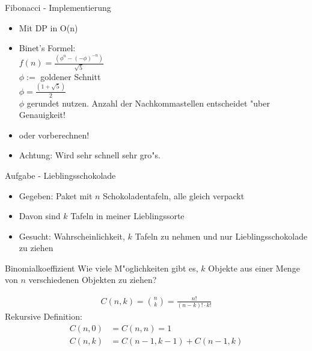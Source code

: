 \documentclass[18pt]{beamer}
\begin{document}
\begin{frame}{Fibonacci - Implementierung}
\begin{itemize}
\item Mit DP in O(n)
\item Binet's Formel: \\
\(f(n) = \frac{(\phi^{n} - (-\phi)^{-n}) }{ \sqrt{5}}\)\\
\(\phi :=\)  goldener Schnitt\\
\(\phi = \frac{ (1+\sqrt{5})}{2}\)\\
\(\phi\) gerundet nutzen. Anzahl der Nachkommastellen entscheidet "uber Genauigkeit!

\item oder vorberechnen!\\
\item Achtung: Wird sehr schnell sehr gro"s.
\end{itemize}
\end{frame}

\begin{frame}{Aufgabe - Lieblingsschokolade}
\begin{itemize}
\item Gegeben: Paket mit $n$ Schokoladentafeln, alle gleich verpackt
\item Davon sind $k$ Tafeln in meiner Lieblingssorte
\item Gesucht: Wahrscheinlichkeit, $k$ Tafeln zu nehmen und nur Lieblingsschokolade zu ziehen
\end{itemize}
\end{frame}

\begin{frame}{Binomialkoeffizient}
Wie viele M"oglichkeiten gibt es, $k$ Objekte aus einer Menge von $n$ verschiedenen Objekten zu ziehen?

\begin{align*}
C\left( n,k \right) = \binom{n}{k} = \frac{n!}{\left( n-k \right) ! \cdot k!}
\end{align*}
Rekursive Definition:
\begin{align*}
C\left( n, 0 \right) &= C\left( n,n \right) = 1 \\
C\left( n,k \right) &= C\left( n-1,k-1 \right) + C\left( n-1,k \right)
\end{align*} %
\end{frame}
\end{document}
